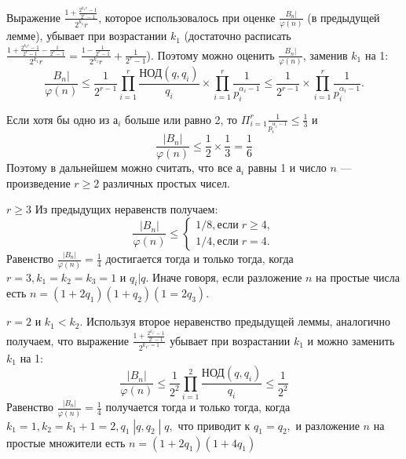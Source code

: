 	\noindent
	
	Выражение $\frac{1+\frac{2^{k_1r}-1}{2^r-1}}{2^{k_1}r}$, которое использовалось при оценке $\frac{B_n|}{\varphi(n)}$ (в предыдущей лемме), убывает при возрастании $k_1$ (достаточно расписать
	$\frac{1+\frac{2^{k_1r}-1}{2^r-1}-\frac{1}{2^r-1}}{2^{k_1}r} = \frac{1-\frac{1}{2^r-1}}{2^{k_1}r} + \frac{1}{2^r-1}$). Поэтому можно оценить $\frac{B_n|}{\varphi(n)}$, заменив $k_1$ на 1:
	\begin{equation}
	\frac{B_n|}{\varphi(n)} \leqslant \frac{1}{2^{r-1}}\prod^{r}_{i=1} \frac{\text{НОД}(q,q_i)}{q_i} \times \prod^{r}_{i=1} \frac{1}{p_{i}^{\alpha_i-1}} \leqslant \frac{1}{2^{r-1}} \times \prod^{r}_{i=1} \frac{1}{p_{i}^{\alpha_i-1}}.
	\end{equation} 
	

	\pagebreak
	\noindent
	Если хотя бы одно из $а_i$ больше или равно 2, то $\Pi^{r}_{i=1}\frac{1}{p_{i}^{\alpha_i-1}} \leqslant \frac{1}{3}$ и 
	\begin{equation}
	\frac{|B_n|}{\varphi(n)}\leqslant \frac{1}{2} \times \frac{1}{3} = \frac{1}{6}
	\end{equation}	
	Поэтому в дальнейшем можно считать, что все $а_i$ равны 1 и число $n$ —
	произведение $r \geqslant 2$ различных простых чисел.
	\begin{beznomera}[Случай]
	$r \geqslant 3$ Из предыдущих неравенств получаем: 
	\begin{equation}
	\frac{|B_n|}{\varphi(n)} \leqslant 
	\begin{cases}
	1/8, \text{если}\;r\geqslant 4, \\ 
	1/4, \text{если}\;r = 4.
	\end{cases}
	\end{equation}	
	Равенство $\frac{|B_n|}{\varphi(n)} = \frac{1}{4}$ достигается тогда и только тогда, когда $r = 3, k_1=k_2=k_3=1$ и $q_i|q$. Иначе говоря, если разложение $n$ на простые числа есть $n=(1+2q_1)(1+q_2)(1=2q_3)$.
	
	\end{beznomera}

	\begin{beznomera}[Случай]
			$r = 2$ и $k_1<k_2.$ Используя второе неравенство предыдущей леммы, аналогично получаем, что выражение $\frac{1+ \frac{2^{k_{1^r}}-1}{2^r-1}}{2^{k_{1^r}=1}}$ убывает	при возрастании $k_1$ и можно заменить $k_1$ на 1:
			\begin{equation}
			\frac{|B_n|}{\varphi(n)} \leqslant \frac{1}{2^2}\prod^{2}_{i=1} \frac{\text{НОД}(q,q_i)}{q_i} \leqslant \frac{1}{2^2}
			\end{equation}
	Равенство 	$\frac{|B_n|}{\varphi(n)} = \frac{1}{4}$ получается тогда и только тогда, когда $k_1=1, k_2=k_1 +1 = 2,q_1\;|q,q_2\;|\;q,$ что приводит к $q_1=q_2,$ и разложение $n$ на	простые множители есть $n=(1+2q_1)(1+4q_1)$
	\end{beznomera}	


